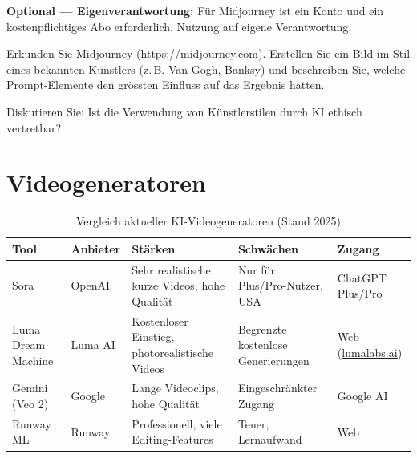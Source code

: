 \begin{mychallenge}
\begin{myattention}
\textbf{Optional --- Eigenverantwortung:} Für Midjourney ist ein Konto
und ein kostenpflichtiges Abo erforderlich. Nutzung auf eigene Verantwortung.
\end{myattention}

Erkunden Sie Midjourney (\url{https://midjourney.com}). Erstellen Sie ein Bild
im Stil eines bekannten Künstlers (z.\,B. Van Gogh, Banksy) und beschreiben Sie,
welche Prompt-Elemente den grössten Einfluss auf das Ergebnis hatten.

Diskutieren Sie: Ist die Verwendung von Künstlerstilen durch KI ethisch
vertretbar?
\end{mychallenge}

\section{Videogeneratoren}

\begin{table}[H]
\centering
\caption{Vergleich aktueller KI-Videogeneratoren (Stand 2025)}
\label{tab:videogen-vergleich}
\small
\begin{tabular}{p{2.5cm}p{2cm}p{3.5cm}p{3.5cm}p{2cm}}
    \toprule
    \textbf{Tool}   & \textbf{Anbieter} & \textbf{Stärken}                               & \textbf{Schwächen}                           & \textbf{Zugang}    \\
    \midrule
    Sora            & OpenAI            & Sehr realistische kurze Videos, hohe Qualität   & Nur für Plus/Pro-Nutzer, USA                 & ChatGPT Plus/Pro   \\
    \midrule
    Luma Dream Machine & Luma AI        & Kostenloser Einstieg, photorealistische Videos  & Begrenzte kostenlose Generierungen           & Web (\url{lumalabs.ai}) \\
    \midrule
    Gemini (Veo 2)  & Google           & Lange Videoclips, hohe Qualität                 & Eingeschränkter Zugang                       & Google AI          \\
    \midrule
    Runway ML       & Runway           & Professionell, viele Editing-Features           & Teuer, Lernaufwand                           & Web               \\
    \bottomrule
\end{tabular}
\end{table}

